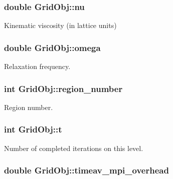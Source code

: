 \subsubsection[{\texorpdfstring{nu}{nu}}]{\setlength{\rightskip}{0pt plus 5cm}double Grid\+Obj\+::nu}\hypertarget{class_grid_obj_a755f85eb5480d959211e00937a478ae9}{}\label{class_grid_obj_a755f85eb5480d959211e00937a478ae9}


Kinematic viscosity (in lattice units) 

\subsubsection[{\texorpdfstring{omega}{omega}}]{\setlength{\rightskip}{0pt plus 5cm}double Grid\+Obj\+::omega}\hypertarget{class_grid_obj_a21461e5d39c5ae83ae42170c829e9da3}{}\label{class_grid_obj_a21461e5d39c5ae83ae42170c829e9da3}


Relaxation frequency. 

\subsubsection[{\texorpdfstring{region\+\_\+number}{region_number}}]{\setlength{\rightskip}{0pt plus 5cm}int Grid\+Obj\+::region\+\_\+number}\hypertarget{class_grid_obj_ae0b724f2d977cfe38df2bb191e2fb042}{}\label{class_grid_obj_ae0b724f2d977cfe38df2bb191e2fb042}


Region number. 

\subsubsection[{\texorpdfstring{t}{t}}]{\setlength{\rightskip}{0pt plus 5cm}int Grid\+Obj\+::t}\hypertarget{class_grid_obj_a783b18a053e244ae7b7b436ab21c0592}{}\label{class_grid_obj_a783b18a053e244ae7b7b436ab21c0592}


Number of completed iterations on this level. 

\subsubsection[{\texorpdfstring{timeav\+\_\+mpi\+\_\+overhead}{timeav_mpi_overhead}}]{\setlength{\rightskip}{0pt plus 5cm}double Grid\+Obj\+::timeav\+\_\+mpi\+\_\+overhead}\hypertarget{class_grid_obj_a147cfb80b653ca4432432e8185cf38ef}{}\label{class_grid_obj_a147cfb80b653ca4432432e8185cf38ef}



